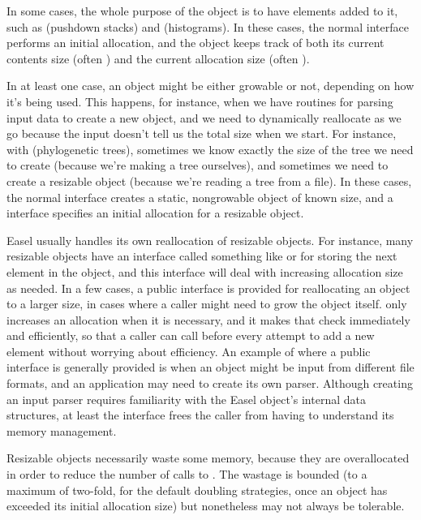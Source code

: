 In some cases, the whole purpose of the object is to have elements
added to it, such as  (pushdown stacks) and
 (histograms). In these cases, the normal
 interface performs an initial allocation, and the
object keeps track of both its current contents size (often
) and the current allocation size (often
). 

In at least one case, an object might be either growable or not,
depending on how it's being used. This happens, for instance, when we
have routines for parsing input data to create a new object, and we
need to dynamically reallocate as we go because the input doesn't tell
us the total size when we start. For instance, with 
(phylogenetic trees), sometimes we know exactly the size of the tree
we need to create (because we're making a tree ourselves), and
sometimes we need to create a resizable object (because we're reading a
tree from a file). In these cases, the normal 
interface creates a static, nongrowable object of known size, and a
 interface specifies an initial allocation
for a resizable object.

Easel usually handles its own reallocation of resizable objects. For
instance, many resizable objects have an interface called something
like  or  for storing the next element
in the object, and this interface will deal with increasing allocation
size as needed.  In a few cases, a public  interface
is provided for reallocating an object to a larger size, in cases
where a caller might need to grow the object itself. 
only increases an allocation when it is necessary, and it makes that
check immediately and efficiently, so that a caller can call
 before every attempt to add a new element without
worrying about efficiency. An example of where a public
 interface is generally provided is when an object
might be input from different file formats, and an application may
need to create its own parser. Although creating an input parser
requires familiarity with the Easel object's internal data structures,
at least the  interface frees the caller from having
to understand its memory management.

Resizable objects necessarily waste some memory, because they are
overallocated in order to reduce the number of calls to
.  The wastage is bounded (to a maximum of two-fold,
for the default doubling strategies, once an object has exceeded its
initial allocation size) but nonetheless may not always be tolerable.

